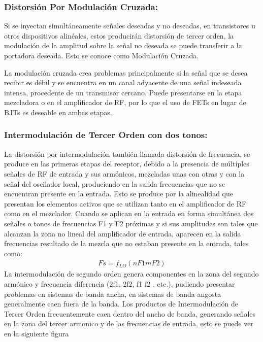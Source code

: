 \documentclass[letterpaper,10pt,spanish]{sphinxmanual}
\let\sphinxpxdimen\pdfpxdimen\else\newdimen\sphinxpxdimen
\begin{document}
\subsubsection{Distorsión Por Modulación Cruzada:}
\label{\detokenize{introduccion/sistemas:Distorsi_xf3n-Por-Modulaci_xf3n-Cruzada:}}
Si se inyectan simultáneamente señales deseadas y no deseadas, en transistores u otros dispositivos alinéales, estos producirán distorsión de tercer orden, la modulación de la amplitud sobre la señal no deseada se puede transferir a la portadora deseada. Esto se conoce como Modulación Cruzada.

La modulación cruzada crea problemas principalmente si la señal que se desea recibir es débil y se encuentra en un canal adyacente de una señal indeseada intensa, procedente de un transmisor cercano. Puede presentarse en la etapa mezcladora o en el amplificador de RF, por lo que el uso de FETs en lugar de BJTs es deseable en ambas etapas.

\sphinxincludegraphics[width=1791\sphinxpxdimen,height=834\sphinxpxdimen]{{linealidad1}.png}


\subsubsection{Intermodulación de Tercer Orden con dos tonos:}
\label{\detokenize{introduccion/sistemas:Intermodulaci_xf3n-de-Tercer-Orden-con-dos-tonos:}}
La distorsión por intermodulación también llamada distorsión de frecuencia, se produce en las primeras etapas del receptor, debido a la presencia de múltiples señales de RF de entrada y sus armónicos, mezcladas unas con otras y con la señal del oscilador local, produciendo en la salida frecuencias que no se encuentran presente en la entrada. Esto se produce por la alinealidad que presentan los elementos activos que se utilizan tanto en el amplificador de RF como en el mezclador. Cuando se
aplican en la entrada en forma simultánea dos señales o tonos de frecuencias F1 y F2 próximas y si sus amplitudes son tales que alcanzan la zona no lineal del amplificador de entrada, aparecen en la salida frecuencias resultado de la mezcla que no estaban presente en la entrada, tales como:
\begin{equation*}
\begin{split}Fs  =  f_{LO} ( nF1 mF2)\end{split}
\end{equation*}
La intermodulación de segundo orden genera componentes en la zona del segundo armónico y frecuencia diferencia (2f1, 2f2, f1 f2 , etc.), pudiendo presentar problemas en sistemas de banda ancha, en sistemas de banda angosta generalmente caen fuera de la banda. Los productos de Intermodulación de Tercer Orden frecuentemente caen dentro del ancho de banda, generando señales en la zona del tercer armonico y de las frecuencias de entrada, esto se puede ver en la siguiente figura
\end{document}
